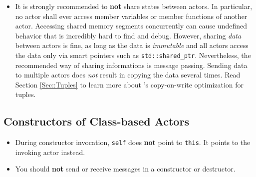 \begin{itemize}
\item It is strongly recommended to \textbf{not} share states between actors.
In particular, no actor shall ever access member variables or member functions of another actor.
Accessing shared memory segments concurrently can cause undefined behavior that is incredibly hard to find and debug.
However, sharing \textit{data} between actors is fine, as long as the data is \textit{immutable} and all actors access the data only via smart pointers such as \lstinline^std::shared_ptr^.
Nevertheless, the recommended way of sharing informations is message passing.
Sending data to multiple actors does \textit{not} result in copying the data several times.
Read Section \ref{Sec::Tuples} to learn more about \libcppa's copy-on-write optimization for tuples.
\end{itemize}

\subsection{Constructors of Class-based Actors}

\begin{itemize}
\item During constructor invocation, \lstinline^self^ does \textbf{not} point to \lstinline^this^. It points to the invoking actor instead.
\item You should \textbf{not} send or receive messages in a constructor or destructor.
\end{itemize}
